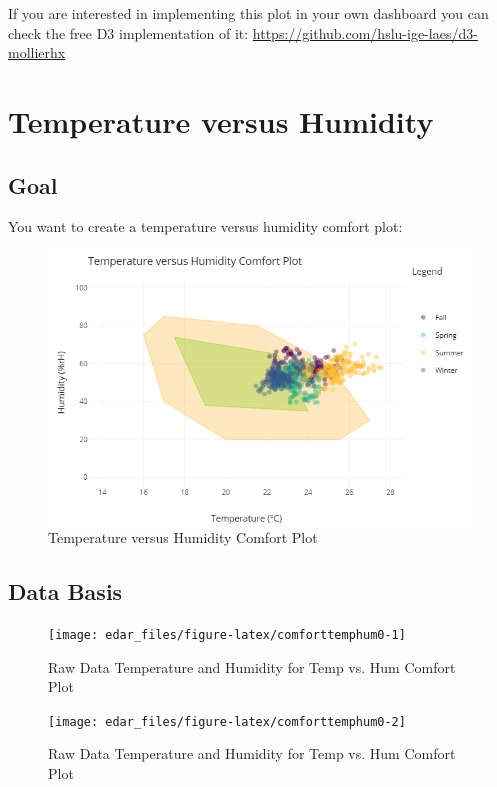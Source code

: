 \documentclass[
  a4paperpaper,
]{book}
\begin{document}
If you are interested in implementing this plot in your own dashboard you can check the free D3 implementation of it:
\url{https://github.com/hslu-ige-laes/d3-mollierhx}

\newpage

\hypertarget{temperature-versus-humidity}{%
\section{Temperature versus Humidity}\label{temperature-versus-humidity}}

\hypertarget{goal-19}{%
\subsection{Goal}\label{goal-19}}

You want to create a temperature versus humidity comfort plot:

\begin{figure}
\includegraphics[width=0.7\linewidth]{images/comfortTempHum} \caption{Temperature versus Humidity Comfort Plot}\label{fig:unnamed-chunk-29}
\end{figure}

\hypertarget{data-basis-19}{%
\subsection{Data Basis}\label{data-basis-19}}

\begin{figure}
\texttt{[image: edar\_files/figure-latex/comforttemphum0-1]} \caption{Raw Data Temperature and Humidity for Temp vs. Hum Comfort Plot}\label{fig:comforttemphum0-1}
\end{figure}
\begin{figure}
\texttt{[image: edar\_files/figure-latex/comforttemphum0-2]} \caption{Raw Data Temperature and Humidity for Temp vs. Hum Comfort Plot}\label{fig:comforttemphum0-2}
\end{figure}
\end{document}
